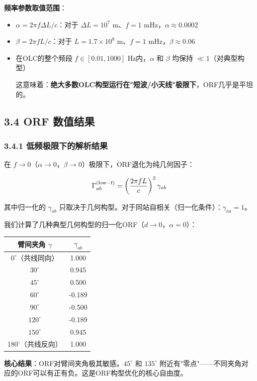 \documentclass[12pt,a4paper]{article}
\begin{document}
\textbf{频率参数取值范围}：

\begin{itemize}
  \item $\alpha = 2\pi f \Delta L / c$：对于 $\Delta L = 10^7$ m、$f = 1$ mHz，$\alpha \approx 0.0002$
  \item $\beta = 2\pi f L / c$：对于 $L = 1.7 \times 10^8$ m、$f = 1$ mHz，$\beta \approx 0.06$
  \item 在OLC的整个频段 $f \in [0.01, 1000]$ Hz内，$\alpha$ 和 $\beta$ 均保持 $\ll 1$（对典型构型）

这意味着：\textbf{绝大多数OLC构型运行在"短波/小天线"极限下}，ORF几乎是平坦的。

\end{itemize}
\subsection{3.4 ORF 数值结果}


\subsubsection{3.4.1 低频极限下的解析结果}


在 $f \to 0$（$\alpha \to 0$，$\beta \to 0$）极限下，ORF退化为纯几何因子：

$$\Gamma_{ab}^{\rm (low-f)} = \left(\frac{2\pi f L}{c}\right)^2 \gamma_{ab}$$

其中归一化的 $\gamma_{ab}$ 只取决于几何构型。对于同站自相关（归一化条件）：$\gamma_{aa} = 1$。

我们计算了几种典型几何构型的归一化ORF（$d \to 0$，$\alpha = 0$）：

\begin{tabular}{|c|c|}
\hline
臂间夹角 $\gamma$ & $\gamma_{ab}$ \\
\hline
$0^\circ$（共线同向） & 1.000 \\
$30^\circ$ & 0.945 \\
$45^\circ$ & 0.500 \\
$60^\circ$ & -0.189 \\
$90^\circ$ & -0.500 \\
$120^\circ$ & -0.189 \\
$150^\circ$ & 0.945 \\
$180^\circ$（共线反向） & 1.000 \\
\hline
\end{tabular}


\textbf{核心结果}：ORF对臂间夹角极其敏感。$45^\circ$ 和 $135^\circ$ 附近有"零点"——不同夹角对应的ORF可以有正有负。这是ORF构型优化的核心自由度。
\end{document}
